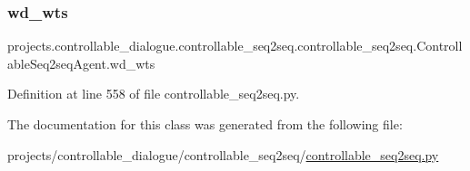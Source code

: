 \subsubsection{\texorpdfstring{wd\+\_\+wts}{wd\_wts}}
{\footnotesize\ttfamily projects.\+controllable\+\_\+dialogue.\+controllable\+\_\+seq2seq.\+controllable\+\_\+seq2seq.\+Controllable\+Seq2seq\+Agent.\+wd\+\_\+wts}



Definition at line 558 of file controllable\+\_\+seq2seq.\+py.



The documentation for this class was generated from the following file\+:\begin{DoxyCompactItemize}
\item 
projects/controllable\+\_\+dialogue/controllable\+\_\+seq2seq/\hyperlink{controllable__seq2seq_8py}{controllable\+\_\+seq2seq.\+py}\end{DoxyCompactItemize}
